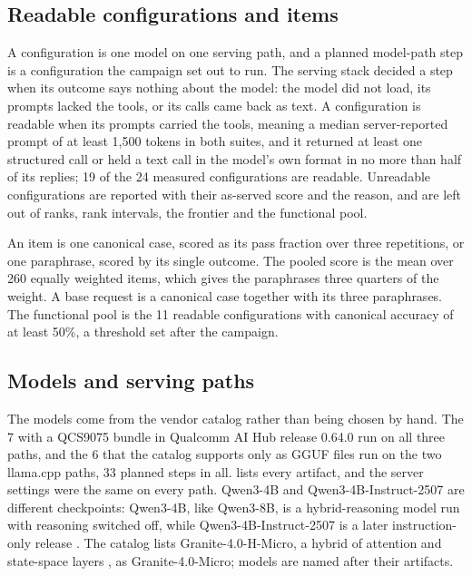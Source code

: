 \documentclass[11pt]{article}
\begin{document}
\subsection{Readable configurations and items}\label{sec:readable}

A configuration is one model on one serving path, and a planned model-path step is a configuration the campaign set out to run. The serving stack decided a step when its outcome says nothing about the model: the model did not load, its prompts lacked the tools, or its calls came back as text. A configuration is readable when its prompts carried the tools, meaning a median server-reported prompt of at least 1,500 tokens in both suites, and it returned at least one structured call or held a text call in the model's own format in no more than half of its replies; 19 of the 24 measured configurations are readable. Unreadable configurations are reported with their as-served score and the reason, and are left out of ranks, rank intervals, the frontier and the functional pool.

An item is one canonical case, scored as its pass fraction over three repetitions, or one paraphrase, scored by its single outcome. The pooled score is the mean over 260 equally weighted items, which gives the paraphrases three quarters of the weight. A base request is a canonical case together with its three paraphrases. The functional pool is the 11 readable configurations with canonical accuracy of at least 50\%, a threshold set after the campaign.

\subsection{Models and serving paths}\label{sec:models}

The models come from the vendor catalog rather than being chosen by hand. The 7 with a QCS9075 bundle in Qualcomm AI Hub release 0.64.0 run on all three paths, and the 6 that the catalog supports only as GGUF files run on the two llama.cpp paths, 33 planned steps in all.  lists every artifact, and the server settings were the same on every path. Qwen3-4B and Qwen3-4B-Instruct-2507 are different checkpoints: Qwen3-4B, like Qwen3-8B, is a hybrid-reasoning model run with reasoning switched off, while Qwen3-4B-Instruct-2507 is a later instruction-only release \citep{qwen3cards}. The catalog lists Granite-4.0-H-Micro, a hybrid of attention and state-space layers \citep{granite4}, as Granite-4.0-Micro; models are named after their artifacts.
\end{document}
